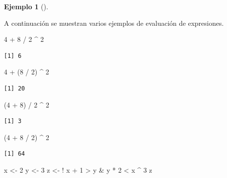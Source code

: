 \documentclass[
  a4paper,
]{scrreport}
\newenvironment{Shaded}{\begin{snugshade}}{\end{snugshade}}
\newcommand{\DecValTok}[1]{\textcolor[rgb]{0.68,0.00,0.00}{#1}}
\newcommand{\NormalTok}[1]{\textcolor[rgb]{0.00,0.23,0.31}{#1}}
\newcommand{\OtherTok}[1]{\textcolor[rgb]{0.00,0.23,0.31}{#1}}
\newcommand{\SpecialCharTok}[1]{\textcolor[rgb]{0.37,0.37,0.37}{#1}}
\theoremstyle{definition}
\newtheorem{example}{Ejemplo}[chapter]
\theoremstyle{definition}
\theoremstyle{remark}
\begin{document}
\leavevmode{}%
\begin{example}[]\label{exm-prioridad-evaluacion}

A continuación se muestran varios ejemplos de evaluación de expresiones.

\begin{Shaded}
\begin{Highlighting}[]
\DecValTok{4} \SpecialCharTok{+} \DecValTok{8} \SpecialCharTok{/} \DecValTok{2} \SpecialCharTok{\^{}} \DecValTok{2}
\end{Highlighting}
\end{Shaded}

\begin{verbatim}
[1] 6
\end{verbatim}

\begin{Shaded}
\begin{Highlighting}[]
\DecValTok{4} \SpecialCharTok{+}\NormalTok{ (}\DecValTok{8} \SpecialCharTok{/} \DecValTok{2}\NormalTok{) }\SpecialCharTok{\^{}} \DecValTok{2}
\end{Highlighting}
\end{Shaded}

\begin{verbatim}
[1] 20
\end{verbatim}

\begin{Shaded}
\begin{Highlighting}[]
\NormalTok{(}\DecValTok{4} \SpecialCharTok{+} \DecValTok{8}\NormalTok{) }\SpecialCharTok{/} \DecValTok{2} \SpecialCharTok{\^{}} \DecValTok{2}
\end{Highlighting}
\end{Shaded}

\begin{verbatim}
[1] 3
\end{verbatim}

\begin{Shaded}
\begin{Highlighting}[]
\NormalTok{(}\DecValTok{4} \SpecialCharTok{+} \DecValTok{8} \SpecialCharTok{/} \DecValTok{2}\NormalTok{) }\SpecialCharTok{\^{}} \DecValTok{2}
\end{Highlighting}
\end{Shaded}

\begin{verbatim}
[1] 64
\end{verbatim}

\begin{Shaded}
\begin{Highlighting}[]
\NormalTok{x }\OtherTok{\textless{}{-}} \DecValTok{2} 
\NormalTok{y }\OtherTok{\textless{}{-}} \DecValTok{3}
\NormalTok{z }\OtherTok{\textless{}{-}} \SpecialCharTok{!}\NormalTok{ x }\SpecialCharTok{+} \DecValTok{1} \SpecialCharTok{\textgreater{}}\NormalTok{ y }\SpecialCharTok{\&}\NormalTok{ y }\SpecialCharTok{*} \DecValTok{2}  \SpecialCharTok{\textless{}}\NormalTok{ x }\SpecialCharTok{\^{}} \DecValTok{3}
\NormalTok{z}
\end{Highlighting}
\end{Shaded}


\end{example}
\end{document}

